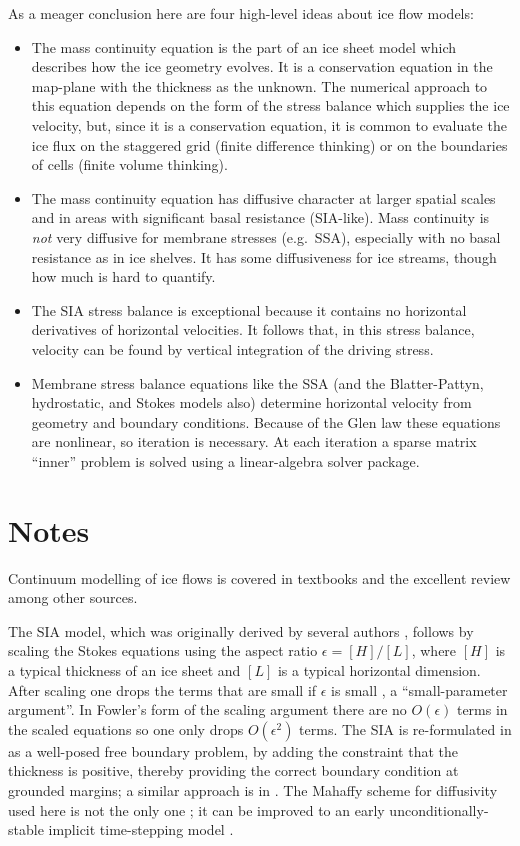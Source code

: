 \documentclass[letterpaper,final,12pt,reqno]{amsart}
\newcommand{\eps}{\epsilon}
\begin{document}
As a meager conclusion here are four high-level ideas about ice flow models:
\begin{itemize}
\item The mass continuity equation is the part of an ice sheet model which describes how the ice geometry evolves.  It is a conservation equation in the map-plane with the thickness as the unknown.   The numerical approach to this equation depends on the form of the stress balance which supplies the ice velocity, but, since it is a conservation equation, it is common to evaluate the ice flux on the staggered grid (finite difference thinking) or on the boundaries of cells (finite volume thinking).
\item The mass continuity equation has diffusive character at larger spatial scales and in areas with significant basal resistance (SIA-like).  Mass continuity is \emph{not} very diffusive for membrane stresses (e.g.~SSA), especially with no basal resistance as in ice shelves.  It has some diffusiveness for ice streams, though how much is hard to quantify.
\item The SIA stress balance is exceptional because it contains no horizontal derivatives of horizontal velocities.  It follows that, in this stress balance, velocity can be found by vertical integration of the driving stress.
\item Membrane stress balance equations like the SSA (and the Blatter-Pattyn, hydrostatic, and Stokes models also) determine horizontal velocity from geometry and boundary conditions.  Because of the Glen law these equations are nonlinear, so iteration is necessary.  At each iteration a sparse matrix ``inner'' problem is solved using a linear-algebra solver package.
\end{itemize}


\section{Notes} \label{sec:nr}

Continuum modelling of ice flows is covered in textbooks \cite{CuffeyPaterson,GreveBlatter2009,vanderVeen} and the excellent review \cite{SchoofHewitt2013} among other sources.

The SIA model, which was originally derived by several authors \cite{FowlerLarson1978,Hutter,MorlandJohnson}, follows by scaling the Stokes equations using the aspect ratio $\eps = [H]/[L]$, where $[H]$ is a typical thickness of an ice sheet and $[L]$ is a typical horizontal dimension.  After scaling one drops the terms that are small if $\eps$ is small \cite{Fowler,Hutter}, a ``small-parameter argument''.  In Fowler's form of the scaling argument \cite{Fowler} there are no $O(\eps)$ terms in the scaled equations so one only drops $O(\eps^2)$ terms.  The SIA is re-formulated in \cite{JouvetBueler2012} as a well-posed free boundary problem, by adding the constraint that the thickness is positive, thereby providing the correct boundary condition at grounded margins; a similar approach is in \cite{Bueler2016}.  The Mahaffy \cite{Mahaffy} scheme for diffusivity used here is not the only one \cite{HindmarshPayne}; it can be improved to an early unconditionally-stable implicit time-stepping model \cite{Bueler2016}.
\end{document}
